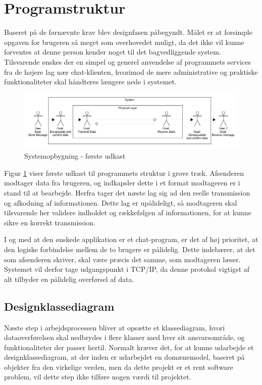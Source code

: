 \section{Programstruktur}
Baseret på de førnævnte krav blev designfasen påbegyndt. Målet er at forsimple opgaven for brugeren så meget som overhovedet muligt, da det ikke vil kunne forventes at denne person kender noget til det bagvedliggende system.
Tilsvarende ønskes der en simpel og generel anvendelse af programmets services fra de højere lag nær chat-klienten, hvorimod de mere administrative og praktiske funktionaliteter skal håndteres længere nede i systemet.

\begin{figure}[h!]
\centering
\includegraphics[scale=0.5]{Billeder/ProgramOpbygning1.JPG}
\caption{Systemopbygning - første udkast}
\label{fig:Blokdiagram}
\end{figure}

Figur \ref{fig:Blokdiagram} viser første udkast til programmets struktur i grove træk. Afsenderen modtager data fra brugeren, og indkapsler dette i et format modtageren er i stand til at bearbejde. Herfra tager det næste lag sig ad den reelle transmission og afkodning af informationen. Dette lag er upålideligt, så modtageren skal tilsvarende her validere indholdet og rækkefølgen af informationen, for at kunne sikre en korrekt transmission.

I og med at den ønskede applikation er et chat-program, er det af høj prioritet, at den logiske forbindelse mellem de to brugere er pålidelig. Dette indebærer, at det som afsenderen skriver, skal være præcis det samme, som modtageren læser. Systemet vil derfor tage udgangspunkt i TCP/IP, da denne protokol vigtigst af alt tilbyder en pålidelig overførsel af data. 


\subsection{Designklassediagram}
Næste step i arbejdsprocessen bliver at opsætte et klassediagram, hvori dataoverførelsen skal nedbrydes i flere klasser med hver sit ansvarsområde, og funktionaliteter der passer hertil. Normalt kræver det, for at kunne udarbejde et designklassediagram, at der inden er udarbejdet en domænemodel, baseret på objekter fra den virkelige verden, men da dette projekt er et rent software problem, vil dette step ikke tilføre nogen værdi til projektet. 

